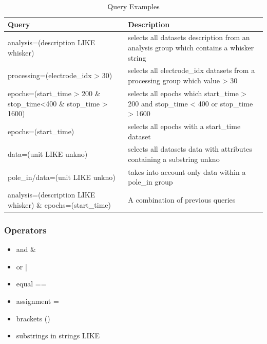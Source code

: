 \documentclass[utf8]{frontiersSCNS} %
\begin{document}
\begin{table}
\caption{Query Examples}
\label{tab:query-examples}       %

\begin{tabular}{ |p{7cm}|p{9cm}| }
\hline
	 \textbf{Query}                                  &       \textbf{Description} \\ \hline
	
	 analysis=(description LIKE whisker)  &  selects all datasets description from an analysis group which contains a whisker string  \\ \hline
	 processing=(electrode\_idx > 30)        &  selects all electrode\_idx datasets from a processing group which value > 30   \\ \hline
	 epochs=(start\_time > 200 \& stop\_time<400 \& stop\_time > 1600)  &  selects all epochs which start\_time > 200 and stop\_time < 400 or stop\_time > 1600 \\ \hline
	 epochs=(start\_time)                     &  selects all epochs with a start\_time dataset         \\ \hline
	 data=(unit LIKE unkno)  &  selects all datasets data with attributes containing a substring unkno \\ \hline
	 pole\_in/data=(unit LIKE unkno)  &  takes into account only data within a pole\_in group \\ \hline
	 analysis=(description LIKE whisker) \& epochs=(start\_time)   &  A combination of previous queries \\ \hline

\end{tabular}

\end{table}



\subsubsection{Operators}


\begin{itemize}
 \item and \&
 \item or  |
 \item equal ==
 \item assignment =
 \item brackets ()
 \item substrings in strings LIKE
\end{itemize}
\end{document}
